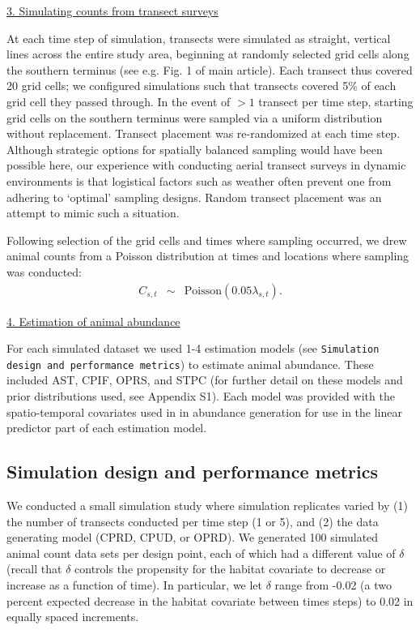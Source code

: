 \documentclass[12pt,fleqn]{article}
\begin{document}
\begin{flushleft}
\underline{3. Simulating counts from transect surveys}

At each time step of simulation, transects were simulated as straight, vertical lines across the entire study area, beginning at randomly selected grid cells along the southern terminus (see e.g. Fig. 1 of main article).  Each transect thus covered 20 grid cells; we configured simulations such that transects covered 5\% of each grid cell they passed through.  In the event of $>1$ transect per time step, starting grid cells on the southern terminus were sampled via a uniform distribution without replacement.  Transect placement was re-randomized at each time step.  Although strategic options for spatially balanced sampling would have been possible here, our experience with conducting aerial transect surveys in dynamic environments is that logistical factors such as weather often prevent one from adhering to `optimal' sampling designs.  Random transect placement was an attempt to mimic such a situation.



Following selection of the grid cells and times where sampling occurred, we drew animal counts from a Poisson distribution at times and locations where sampling was conducted:
\begin{eqnarray*}
  C_{s,t} & \sim & \text{Poisson}(0.05 \lambda_{s,t}).
\end{eqnarray*}

\underline{4. Estimation of animal abundance}

For each simulated dataset we used 1-4 estimation models (see \texttt{Simulation design and performance metrics}) to estimate animal abundance.  These included AST, CPIF, OPRS, and STPC (for further detail on these models and prior distributions used, see Appendix S1).  Each model was provided with the spatio-temporal covariates used in in abundance generation for use in the linear predictor part of each estimation model.

\subsection{Simulation design and performance metrics}

We conducted a small simulation study where simulation replicates varied by (1) the number of transects conducted per time step (1 or 5), and (2) the data generating model (CPRD, CPUD, or OPRD).  We generated 100 simulated animal count data sets per design point, each of which had a different value of $\delta$ (recall that $\delta$ controls the propensity for the habitat covariate to decrease or increase as a function of time).  In particular, we let $\delta$ range from -0.02 (a two percent expected decrease in the habitat covariate between times steps) to 0.02 in equally spaced increments.


\end{flushleft}
\end{document}

